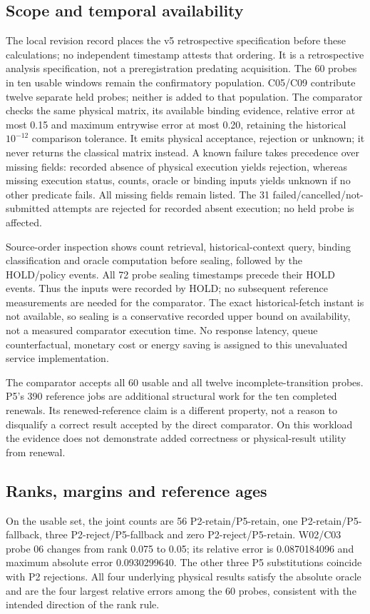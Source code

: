 \documentclass[11pt,a4paper]{article}
\begin{document}
\subsection{Scope and temporal availability}
The local revision record places the v5 retrospective specification before these calculations; no independent timestamp attests that ordering. It is a retrospective analysis specification, not a preregistration predating acquisition. The 60 probes in ten usable windows remain the confirmatory population. C05/C09 contribute twelve separate held probes; neither is added to that population. The comparator checks the same physical matrix, its available binding evidence, relative error at most 0.15 and maximum entrywise error at most 0.20, retaining the historical $10^{-12}$ comparison tolerance. It emits physical acceptance, rejection or unknown; it never returns the classical matrix instead. A known failure takes precedence over missing fields: recorded absence of physical execution yields rejection, whereas missing execution status, counts, oracle or binding inputs yields unknown if no other predicate fails. All missing fields remain listed. The 31 failed/cancelled/not-submitted attempts are rejected for recorded absent execution; no held probe is affected.

Source-order inspection shows count retrieval, historical-context query, binding classification and oracle computation before sealing, followed by the HOLD/policy events. All 72 probe sealing timestamps precede their HOLD events. Thus the inputs were recorded by HOLD; no subsequent reference measurements are needed for the comparator. The exact historical-fetch instant is not available, so sealing is a conservative recorded upper bound on availability, not a measured comparator execution time. No response latency, queue counterfactual, monetary cost or energy saving is assigned to this unevaluated service implementation.

The comparator accepts all 60 usable and all twelve incomplete-transition probes. P5's 390 reference jobs are additional structural work for the ten completed renewals. Its renewed-reference claim is a different property, not a reason to disqualify a correct result accepted by the direct comparator. On this workload the evidence does not demonstrate added correctness or physical-result utility from renewal.

\subsection{Ranks, margins and reference ages}
On the usable set, the joint counts are 56 P2-retain/P5-retain, one P2-retain/P5-fallback, three P2-reject/P5-fallback and zero P2-reject/P5-retain. W02/C03 probe 06 changes from rank 0.075 to 0.05; its relative error is 0.0870184096 and maximum absolute error 0.0930299640. The other three P5 substitutions coincide with P2 rejections. All four underlying physical results satisfy the absolute oracle and are the four largest relative errors among the 60 probes, consistent with the intended direction of the rank rule.
\end{document}
